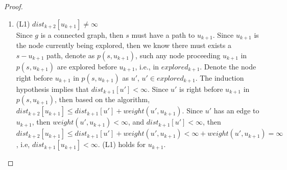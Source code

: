 \documentclass[11pt, oneside]{article}   	%
\theoremstyle{definition}
\begin{document}
\begin{proof}
\begin{itemize}
  \begin{enumerate}
  \item (L1) $dist_{k+2}[u_{k+1}] \neq \infty$
  \\
  Since $g$ is a connected graph, then $s$ must have a path to $u_{k+1}$. Since $u_{k+1}$ is the node currently being explored, then we know there must exists a $s-u_{k+1}$ path, denote as $p(s, u_{k+1})$, such any node proceeding $u_{k+1}$ in $p(s, u_{k+1})$ are explored before $u_{k+1}$, i.e., in $explored_{k+1}$. Denote the node right before $u_{k+1}$ in $p(s, u_{k+1})$ as $u'$, $u' \in explored_{k+1}$. The induction hypothesis implies that $dist_{k+1}[u'] < \infty$. Since $u'$ is right before $u_{k+1}$ in $p(s, u_{k+1})$, then based on the algorithm, $dist_{k+2}[u_{k+1}] \leq dist_{k+1}[u'] + weight(u', u_{k+1})$. Since $u'$ has an edge to $u_{k+1}$, then $weight(u', u_{k+1}) < \infty$, and $dist_{k+1}[u'] < \infty$, then $dist_{k+2}[u_{k+1}] \leq dist_{k+1}[u'] + weight(u', u_{k+1}) < \infty + weight(u', u_{k+1}) = \infty$, i.e, $dist_{k+1}[u_{k+1}] < \infty$. (L1) holds for $u_{k+1}$. \\



\end{enumerate}
\end{itemize}
\end{proof}
\end{document}
